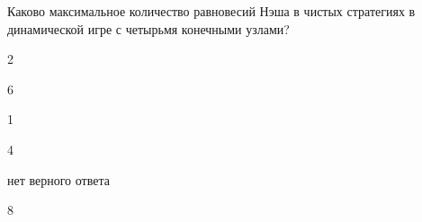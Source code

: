 
\begin{question}
Каково максимальное количество равновесий Нэша в чистых стратегиях в
динамической игре с четырьмя конечными узлами?
\begin{answerlist}
  \item 2
  \item 6
  \item 1
  \item 4
  \item нет верного ответа
  \item 8
\end{answerlist}
\end{question}


